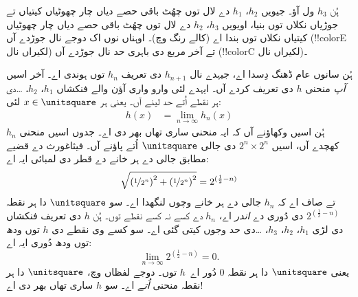 \documentclass[../../../include/open-logic-section]{subfiles}
\begin{document}
ہُن $h_3$ ول آؤ۔ جیویں $h_2$، $h_1$ دے لال توں چھُٹ باقی حصے دیاں چار چھوٹیاں کیتیاں تے جوڑیاں نکلاں توں بنیا، اویویں $h_3$، $h_2$ دے لال توں چھُٹ باقی حصے دیاں چار چھوٹیاں کیتیاں نکلاں توں بندا اے (کالے رنگ وچ)۔ اوہناں نوں اک دوجے نال جوڑدے آں (!!{colorE} لکیراں نال) تے آخر مربع دی باہری حد نال جوڑدے آں (!!{colorC} لکیراں نال)۔
\begin{center}
\end{center}
ہُن سانوں عام ڈھنگ دِسدا اے، جیہدے نال $h_{n+1}$ دی تعریف $h_n$ توں ہوندی اے۔ آخر اسیں \emph{آپ} منحنی $h$ دی تعریف کردے آں۔ ایہدے لئی وارو واری آؤن والے فنکشاں $h_1$، $h_2$، \dots\@ دی ہر نقطے اُتے حد لینے آں۔ یعنی ہر $x \in \unitsquare$ لئی:
\begin{align*}
	h(x) &= \lim_{n \rightarrow \infty} h_n(x)
\end{align*}
ہُن اسیں وکھاؤنے آں کہ ایہ منحنی ساری تھاں بھر دی اے۔ جدوں اسیں منحنی $h_n$ کھچدے آں، اسیں $2^n \times 2^n$ دی جالی $\unitsquare$ اُتے پاؤنے آں۔ فیثاغورث دے قضیے مطابق جالی دے ہر خانے دے قطر دی لمبائی ایہ اے:
\[
\sqrt{\left(\nicefrac{1}{2^{n}}\right)^2+\left(\nicefrac{1}{2^{n}}\right)^2} = 2^{(\frac{1}{2}-n)}
\]
تے صاف اے کہ $h_n$ جالی دے ہر خانے وچوں لنگھدا اے۔ سو $\unitsquare$ دا ہر نقطہ $2^{(\frac{1}{2}-n)}$ دی دُوری دے \emph{اندر} اے، $h_n$ دے کسے نہ کسے نقطے توں۔ ہُن $h$ دی تعریف فنکشاں دی لڑی $h_1$، $h_2$، $h_3$، \dots\@ دی حد وجوں کیتی گئی اے۔ سو کسے وی نقطے دی $h$ توں ودھ توں ودھ دُوری ایہ اے:
\[
\lim_{n \rightarrow \infty} 2^{(\frac{1}{2}-n)} = 0.
\]
یعنی $\unitsquare$ دا ہر نقطہ $0$ دُور اے~$h$ توں۔ دوجے لفظاں وچ، $\unitsquare$ دا ہر نقطہ منحنی \emph{اُتے} اے۔ سو $h$ ساری تھاں بھر دی اے!{}
\end{document}
